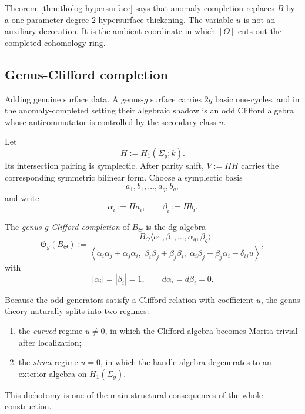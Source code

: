 \begin{remark}
\label{rem:tholog-hypersurface-viewpoint}
Theorem~\ref{thm:tholog-hypersurface} says that anomaly completion replaces \(B\) by a one-parameter degree-\(2\) hypersurface thickening.
The variable \(u\) is not an auxiliary decoration.
It is the ambient coordinate in which \([\Theta]\) cuts out the completed cohomology ring.
\end{remark}

\subsection{Genus-Clifford completion}
\label{subsec:tholog-genus-clifford}

Adding genuine surface data.
A genus-\(g\) surface carries \(2g\) basic one-cycles, and in the anomaly-completed setting their algebraic shadow is an odd Clifford algebra whose anticommutator is controlled by the secondary class \(u\).

Let
\[
H:=H_{1}(\Sigma_{g};k).
\]
Its intersection pairing is symplectic.
After parity shift, \(V:=\Pi H\) carries the corresponding symmetric bilinear form.
Choose a symplectic basis
\[
a_{1},b_{1},\dots,a_{g},b_{g},
\]
and write
\[
\alpha_{i}:=\Pi a_{i},\qquad \beta_{i}:=\Pi b_{i}.
\]

\begin{definition}
\label{def:tholog-genus-clifford}
The \emph{genus-\(g\) Clifford completion} of \(B_{\Theta}\) is the dg algebra
\[
\mathfrak{G}_{g}(B_{\Theta})
:=
\frac{
B_{\Theta}\langle \alpha_{1},\beta_{1},\dots,\alpha_{g},\beta_{g}\rangle
}{
\left\langle
\alpha_{i}\alpha_{j}+\alpha_{j}\alpha_{i},\;
\beta_{i}\beta_{j}+\beta_{j}\beta_{i},\;
\alpha_{i}\beta_{j}+\beta_{j}\alpha_{i}-\delta_{ij}u
\right\rangle
},
\]
with
\[
|\alpha_{i}|=|\beta_{i}|=1,\qquad d\alpha_{i}=d\beta_{i}=0.
\]
\end{definition}

\begin{remark}
\label{rem:tholog-two-regimes}
Because the odd generators satisfy a Clifford relation with coefficient \(u\), the genus theory naturally splits into two regimes:
\begin{enumerate}
\item the \emph{curved} regime \(u\neq 0\), in which the Clifford algebra becomes Morita-trivial after localization;
\item the \emph{strict} regime \(u=0\), in which the handle algebra degenerates to an exterior algebra on \(H_{1}(\Sigma_{g})\).
\end{enumerate}
This dichotomy is one of the main structural consequences of the whole construction.
\end{remark}

